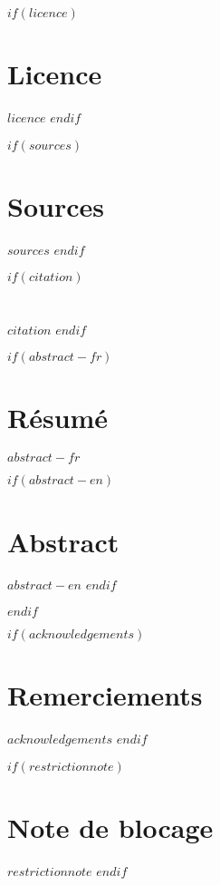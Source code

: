 \renewcommand{\contentsname}{Table des matières}
\renewcommand{\figurename}{Illustration}
\renewcommand{\listfigurename}{Table des figures}

$if(licence)$
\chapter*{Licence}
$licence$
$endif$

$if(sources)$
\chapter*{Sources}
$sources$
$endif$

$if(citation)$
\chapter*{}
$citation$
$endif$

$if(abstract-fr)$
\cleardoublepage
\begin{minipage}{\linewidth}

\chapter*{Résumé}
$abstract-fr$

$if(abstract-en)$
\chapter*{Abstract}
$abstract-en$
$endif$

\end{minipage}
\cleardoublepage
$endif$

$if(acknowledgements)$
\chapter*{Remerciements}
$acknowledgements$
$endif$

$if(restrictionnote)$
\chapter*{Note de blocage}
$restrictionnote$
$endif$

\cleardoublepage